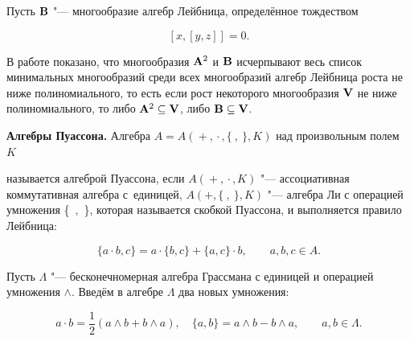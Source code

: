 \smallskip



Пусть ${\bf B}$ "--- многообразие алгебр Лейбница, определённое тождеством

$$

[x, [y,z]]=0.

$$

В работе \cite{cherev:bib:ChOI} показано, что многообразия ${\bf A}^2$ и ${\bf B}$ исчерпывают весь список минимальных многообразий среди всех многообразий алгебр Лейбница роста не ниже полиномиального, то есть если рост некоторого многообразия ${\bf V}$ не ниже полиномиального, то либо ${\bf A}^2 \subseteq {\bf V}$, либо ${\bf B} \subseteq {\bf V}$.






\smallskip



{\bf Алгебры Пуассона.} Алгебра $A=A({}+{},{}\cdot{},\{ ~ , ~ \}, K)$ над произвольным полем $K$

называется алгеброй Пуассона, если $A({}+{}, {}\cdot{} , K)$ "--- ассоциативная коммутативная алгебра с~единицей, $A(+,\{ ~ , ~ \},K)$ "--- алгебра Ли с операцией умножения \mbox{\{{ },{ }\}}, которая называется скобкой Пуассона, и выполняется правило Лейбница:

$$

\{a \cdot b,c\}=a\cdot \{b,c\} + \{ a, c\} \cdot b, \qquad a,b,c

\in A.

$$





Пусть $\Lambda$ "--- бесконечномерная алгебра Грассмана с единицей и операцией умножения $\wedge$. Введём в алгебре $\Lambda$ два новых умножения:

\begin{equation}

\label{poisson_eq10}

a\cdot b = \frac{1}{2}(a\wedge b+b\wedge a), \quad 

\{a,b\}=a\wedge b-b\wedge a, \qquad a, b \in \Lambda.

\end{equation}

